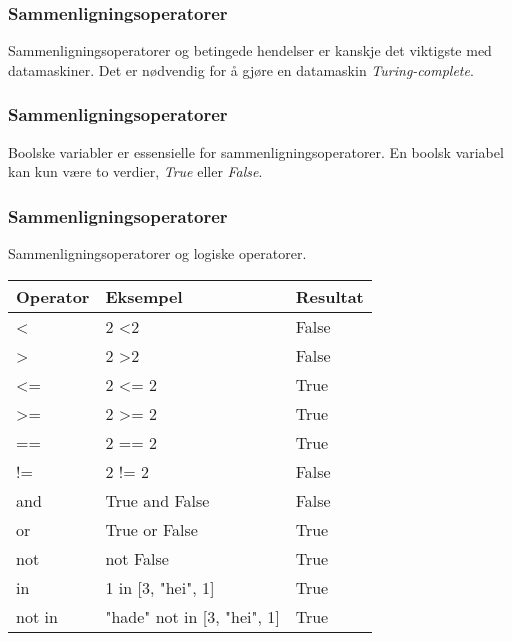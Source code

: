 
\begin{frame}[fragile]
    \frametitle{Sammenligningsoperatorer}

    Sammenligningsoperatorer og betingede hendelser er kanskje det viktigste med datamaskiner. Det er nødvendig for å gjøre en datamaskin \textit{Turing-complete}.

\end{frame}

\begin{frame}[fragile]
    \frametitle{Sammenligningsoperatorer}

    Boolske variabler er essensielle for sammenligningsoperatorer. En boolsk variabel kan kun være to verdier, \textit{True} eller \textit{False}. 

\end{frame}

\begin{frame}
    \frametitle{Sammenligningsoperatorer}

    Sammenligningsoperatorer og logiske operatorer. 

    \begin{table}[]
        \begin{tabular}{|l|l|l|}
        \hline
        Operator        & Eksempel                        & Resultat \\ \hline
        \textless{}     & 2 \textless 2                   & False    \\ \hline
        \textgreater{}  & 2 \textgreater 2                & False    \\ \hline
        \textless{}=    & 2 \textless{}= 2                & True     \\ \hline
        \textgreater{}= & 2 \textgreater{}= 2             & True     \\ \hline
        ==              & 2 == 2                          & True     \\ \hline
        !=              & 2 != 2                          & False    \\ \hline
        and             & True and False                  & False    \\ \hline
        or              & True or False                   & True     \\ \hline
        not             & not False                       & True     \\ \hline
        in              & 1 in {[}3, "hei", 1{]}          & True     \\ \hline
        not in          & "hade" not in {[}3, "hei", 1{]} & True     \\ \hline
        \end{tabular}
    \end{table}

\end{frame}

